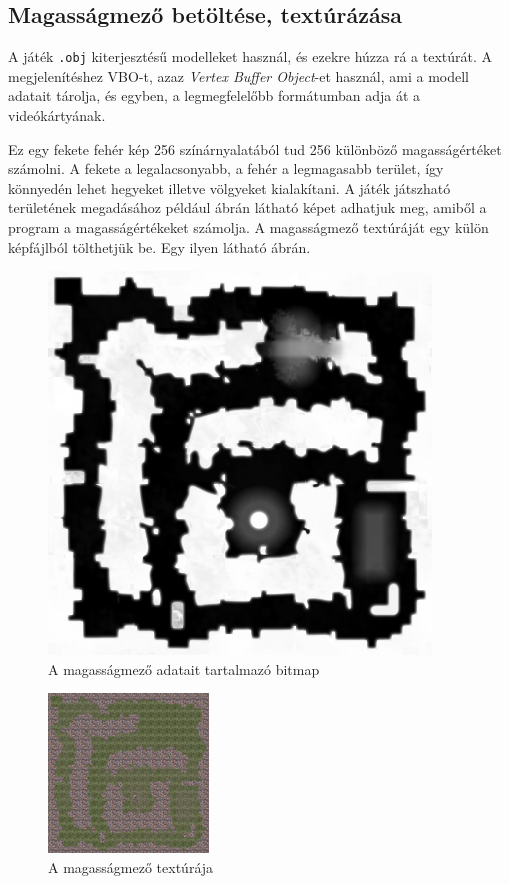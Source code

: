 \subsection{Magasságmező betöltése, textúrázása}

A játék \texttt{.obj} kiterjesztésű modelleket használ, és ezekre húzza rá a textúrát. A megjelenítéshez VBO-t, azaz \textit{Vertex Buffer Object}-et használ, ami a modell adatait tárolja, és egyben, a legmegfelelőbb formátumban adja át a videókártyának.

Ez egy fekete fehér kép 256 színárnyalatából tud 256 különböző magasságértéket számolni. A fekete a legalacsonyabb, a fehér a legmagasabb terület, így könnyedén lehet hegyeket illetve völgyeket kialakítani. A játék játszható területének megadásához például  ábrán látható képet adhatjuk meg, amiből a program a magasságértékeket számolja. A magasságmező textúráját egy külön képfájlból tölthetjük be. Egy ilyen látható  ábrán.

\begin{figure}[h]
\centering
\includegraphics[scale=0.5]{kepek/heightmap.png}
\caption{A magasságmező adatait tartalmazó bitmap}
\label{fig:heightmap}
\end{figure}

\begin{figure}[h]
\centering
\includegraphics[scale=1.5]{kepek/heightmap_texture.png}
\caption{A magasságmező textúrája}
\label{fig:heightmap_texture}
\end{figure}

